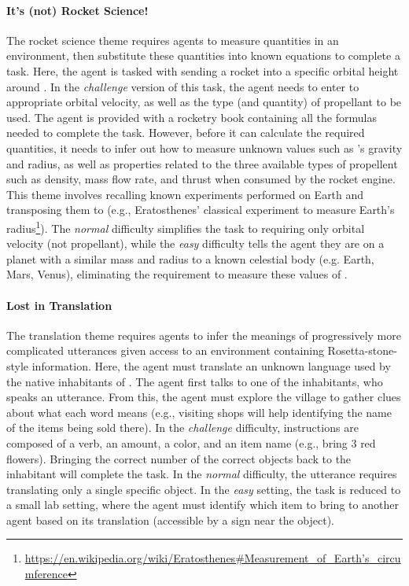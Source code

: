 \paragraph{It's (not) Rocket Science!} The rocket science theme requires agents to measure quantities in an environment, then substitute these quantities into known equations to complete a task.  Here, the agent is tasked with sending a rocket into a specific orbital height around \planetX. In the \textit{challenge} version of this task, the agent needs to enter to appropriate orbital velocity, as well as the type (and quantity) of propellant to be used. The agent is provided with a rocketry book containing all the formulas needed to complete the task. However, before it can calculate the required quantities, it needs to infer out how to measure unknown values such as \planetX's gravity and radius, as well as properties related to the three available types of propellent such as density, mass flow rate, and thrust when consumed by the rocket engine.  This theme involves recalling known experiments performed on Earth and transposing them to \planetX (e.g., Eratosthenes' classical experiment to measure Earth's radius\footnote{\href{https://en.wikipedia.org/wiki/Eratosthenes\#Measurement_of_Earth's_circumference}{https://en.wikipedia.org/wiki/Eratosthenes\#Measurement\_of\_Earth's\_circumference}}).  The \textit{normal} difficulty simplifies the task to requiring only orbital velocity (not propellant), while the \textit{easy} difficulty tells the agent they are on a planet with a similar mass and radius to a known celestial body (e.g. Earth, Mars, Venus), eliminating the requirement to measure these values of \planetX.

\paragraph{Lost in Translation} The translation theme requires agents to infer the meanings of progressively more complicated utterances given access to an environment containing Rosetta-stone-style information.  Here, the agent must translate an unknown language used by the native inhabitants of \planetX. The agent first talks to one of the inhabitants, who speaks an utterance.  From this, the agent must explore the village to gather clues about what each word means (e.g., visiting shops will help identifying the name of the items being sold there). In the \textit{challenge} difficulty, instructions are composed of a verb, an amount, a color, and an item name (e.g., bring 3 red flowers). Bringing the correct number of the correct objects back to the inhabitant will complete the task.  In the \textit{normal} difficulty, the utterance requires translating only a single specific object.  In the \textit{easy} setting, the task is reduced to a small lab setting, where the agent must identify which item to bring to another agent based on its translation (accessible by a sign near the object).



